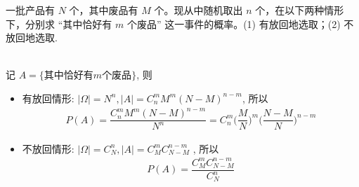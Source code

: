 	\begin{frame}
		\begin{exam}
			一批产品有 $N$ 个，其中废品有 $M$ 个。现从中随机取出 $n$ 个，在以下两种情形下，分别求 “其中恰好有 $m$ 个废品” 这一事件的概率。(1) 有放回地选取；(2) 不放回地选取.
		\end{exam}
		\\
		\pause \jieda 记 $A = \{\mbox{其中恰好有} m \mbox{个废品}\}$, 则
		\begin{itemize}[<+-|alert@+>]
			\item  有放回情形: $|\Omega| = N^n, |A| = C_n^mM^m (N − M)^{n−m}$, 所以
			\begin{eqnarray*}
				P(A)=\dfrac{C_n^mM^m(N − M)^{n−m}}{N^n}=C_n^m\big(\dfrac{M}{N}\big)^m\big(\dfrac{N-M}{N}\big)^{n-m}
			\end{eqnarray*}
			\item 不放回情形: $|\Omega|=C_N^n, |A|=C_M^mC_{N-M}^{n−m}$ , 所以
			\begin{eqnarray*}
				P(A)=\dfrac{C_M^mC_{N-M}^{n−m}}{C_N^n}
			\end{eqnarray*}


		\end{itemize}

	\end{frame}


